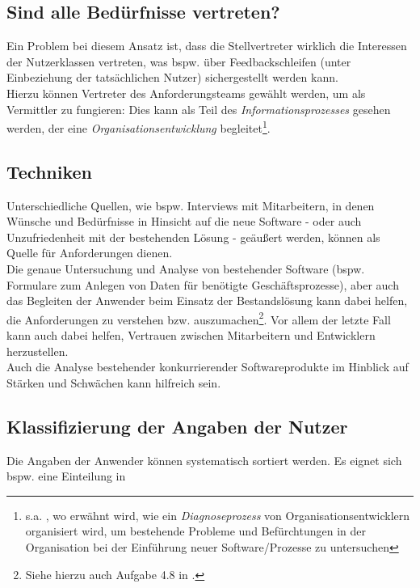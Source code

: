 \subsection*{Sind alle Bedürfnisse vertreten?}
Ein Problem bei diesem Ansatz ist, dass die Stellvertreter wirklich die Interessen der Nutzerklassen vertreten, was bspw. über Feedbackschleifen  (unter Einbeziehung der tatsächlichen Nutzer) sichergestellt werden kann.\\
Hierzu können Vertreter des Anforderungsteams gewählt werden, um als Vermittler zu fungieren: Dies kann als Teil des \textit{Informationsprozesses} gesehen werden, der eine \textit {Organisationsentwicklung} begleitet\footnote{s.a. \cite[53]{Wed09}, wo erwähnt wird, wie ein \textit{Diagnoseprozess} von Organisationsentwicklern organisiert wird, um bestehende Probleme und Befürchtungen in der Organisation bei der Einführung neuer Software/Prozesse zu untersuchen}.

\subsection*{Techniken}
Unterschiedliche Quellen, wie bspw. Interviews mit Mitarbeitern, in denen Wünsche und Bedürfnisse in Hinsicht auf die neue Software - oder auch Unzufriedenheit mit der bestehenden Lösung - geäußert werden, können als Quelle für Anforderungen dienen.\\

\noindent
Die genaue Untersuchung und Analyse von bestehender Software (bspw. Formulare zum Anlegen von Daten für benötigte Geschäftsprozesse), aber auch das Begleiten der Anwender beim Einsatz der Bestandslösung kann dabei helfen, die Anforderungen zu verstehen bzw. auszumachen\footnote{
Siehe hierzu auch Aufgabe 4.8 in \cite{Wed09}.
}.
Vor allem der letzte Fall kann auch dabei helfen, Vertrauen zwischen Mitarbeitern und Entwicklern herzustellen.\\

\noindent
Auch die Analyse bestehender konkurrierender Softwareprodukte im Hinblick auf Stärken und Schwächen kann hilfreich sein.

\subsection*{Klassifizierung der Angaben der Nutzer}
Die Angaben der Anwender können systematisch sortiert werden.
Es eignet sich bspw. eine Einteilung in

